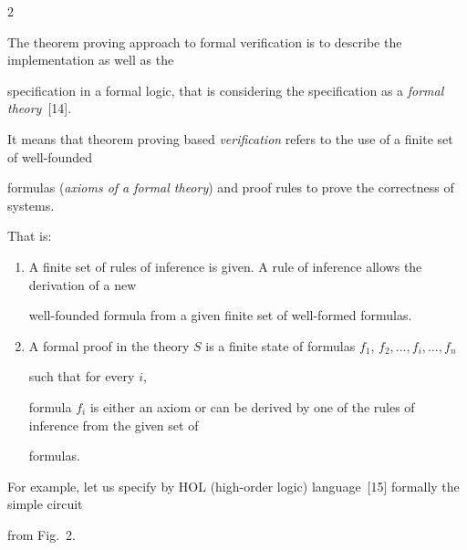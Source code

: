 \begin{multicols}{2}
\noindent


The theorem proving approach to formal verification is to describe the implementation as well as the


specification in a formal logic, that is considering the specification as a \textit{formal theory}~[14].





   It means that theorem proving based \textit{verification} refers to the use of a finite set of well-founded


formulas (\textit{axioms of a formal theory}) and proof rules to prove the correctness of systems.





    That is:


    \begin{enumerate}[1.]


\item A finite set of rules of inference is given. A rule of inference allows the derivation of a new


well-founded formula from a given finite set of well-formed formulas.


\item A formal proof in the theory $S$ is a finite state of formulas $f_1$, $f_2, \ldots , f_i,\ldots , f_n$ 


such that for every $i$,


formula $f_i$ is either an axiom or can be derived by one of the rules of inference from the given set of


formulas.


\end{enumerate}





   For example, let us specify by HOL (high-order logic) language~[15] formally the simple circuit


from Fig.~2.





\bigskip









\vspace*{1pt}



\end{multicols}
